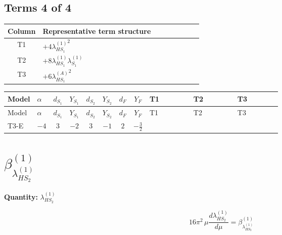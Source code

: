 \documentclass[8pt]{article}
\begin{document}
\begin{landscape}
\subsection*{Terms 4 of 4}
\begin{center}
\begin{tabular}{@{}c >{\raggedright\arraybackslash}p{0.82\linewidth}@{}}
\toprule
Column & Representative term structure \\
\midrule
T1 & \(\displaystyle +4 {\lambda_{HS_1}^{(1)}}^2\) \\
\midrule
T2 & \(\displaystyle +8 {\lambda_{HS_1}^{(1)}} {\lambda_{S_1}^{(1)}}\) \\
\midrule
T3 & \(\displaystyle +6 {\lambda_{HS_1}^{(A)}}^2\) \\
\midrule
\bottomrule
\end{tabular}
\end{center}
\smallskip
\tiny
\begin{longtable}{@{}llcccccc >{\raggedright\arraybackslash}p{0.21\linewidth} >{\raggedright\arraybackslash}p{0.21\linewidth} >{\raggedright\arraybackslash}p{0.21\linewidth}@{}}
\toprule
Model & $\alpha$ & $d_{S_1}$ & $Y_{S_1}$ & $d_{S_2}$ & $Y_{S_2}$ & $d_F$ & $Y_F$ & T1 & T2 & T3 \\
\midrule
\endfirsthead
\toprule
Model & $\alpha$ & $d_{S_1}$ & $Y_{S_1}$ & $d_{S_2}$ & $Y_{S_2}$ & $d_F$ & $Y_F$ & T1 & T2 & T3 \\
\midrule
\endhead
T3-E & $-4$ & $3$ & $-2$ & $3$ & $-1$ & $2$ & $-\frac{3}{2}$ & \scriptsize\adjustbox{max width=\linewidth}{$\begin{gathered} +4 {\lambda_{HS_1}^{(1)}}^2\end{gathered}$} & \scriptsize\adjustbox{max width=\linewidth}{$\begin{gathered} +8 {\lambda_{HS_1}^{(1)}} {\lambda_{S_1}^{(1)}}\end{gathered}$} & \scriptsize\adjustbox{max width=\linewidth}{$\begin{gathered} +6 {\lambda_{HS_1}^{(A)}}^2\end{gathered}$} \\
\midrule
\bottomrule
\end{longtable}
\clearpage
\section*{$\beta_{\lambda_{HS_2}^{(1)}}^{(1)}$}
\noindent\textbf{Quantity: }$\lambda_{HS_2}^{(1)}$\par\smallskip
\[16\pi^2\,\mu\frac{d \lambda_{HS_2}^{(1)}}{d\mu}=\beta_{\lambda_{HS_2}^{(1)}}^{(1)}\]

\end{landscape}
\end{document}
